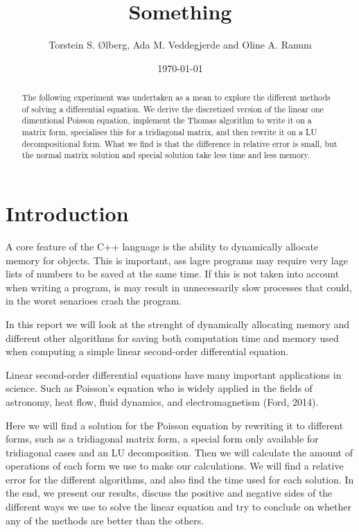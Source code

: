 \documentclass[%
reprint,
amsmath,amssymb,
aps,
]{revtex4-1}
\begin{document}
\title{Something}
\author{Torstein S. Ølberg, Ada M. Veddegjerde and Oline A. Ranum}
\date{\today}


\begin{abstract}
	The following experiment was undertaken as a mean to explore the different methods of solving a differential equation. We derive the discretized version of the linear one dimentional Poisson equation, implement the Thomas algorithm to write it on a matrix form, specialises this for a tridiagonal matrix, and then rewrite it on a LU decompositional form. What we find is that the difference in relative error is small, but the normal matrix solution and special solution take less time and less memory.

\end{abstract}
\maketitle

\section*{Introduction}

A core feature of the C++ language is the ability to dynamically allocate memory for objects. This is important, ass lagre programs may require very lage lists of numbers to be saved at the same time. If this is not taken into account when writing a program, is may result in unnecessarily slow processes that could, in the worst senarioes crash the program.

In this report we will look at the strenght of dynamically allocating memory and different other algorithms for saving both computation time and memory used when computing a simple linear second-order differential equation.

Linear second-order differential equations have many important applications in science. Such as Poisson's equation who is widely applied in the fields of astronomy, heat flow, fluid dynamics, and electromagnetism (Ford, 2014).

Here we will find a solution for the Poisson equation by rewriting it to different forms, such as a tridiagonal matrix form, a special form only available for tridiagonal cases and an LU decomposition. Then we will calculate the amount of operations of each form we use to make our calculations. We will find a relative error for the different algorithms, and also find the time used for each solution. In the end, we present our results, discuss the positive and negative sides of the different ways we use to solve the linear equation and try to conclude on whether any of the methods are better than the others.
\end{document}
